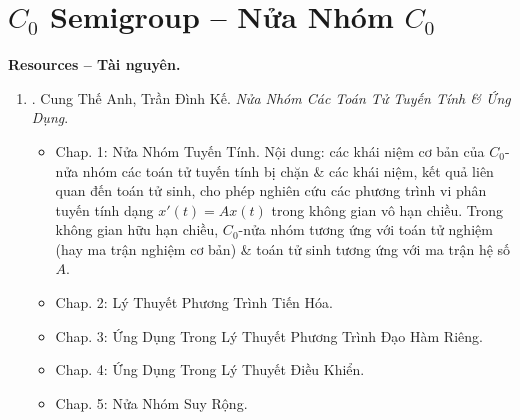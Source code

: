 \documentclass{article}
\begin{document}

\section{$C_0$ Semigroup -- Nửa Nhóm $C_0$}
\textbf{\textsf{Resources -- Tài nguyên.}}
\begin{enumerate}
	\item \cite{Anh_Ke_semigroup}. {\sc Cung Thế Anh, Trần Đình Kế}. {\it Nửa Nhóm Các Toán Tử Tuyến Tính \& Ứng Dụng}.
	
	\begin{itemize}
		\item {\sf Chap. 1: Nửa Nhóm Tuyến Tính.} Nội dung: các khái niệm cơ bản của $C_0$-nửa nhóm các toán tử tuyến tính bị chặn \& các khái niệm, kết quả liên quan đến toán tử sinh, cho phép nghiên cứu các phương trình vi phân tuyến tính dạng $x'(t) = Ax(t)$ trong không gian vô hạn chiều. Trong không gian hữu hạn chiều, $C_0$-nửa nhóm tương ứng với toán tử nghiệm (hay ma trận nghiệm cơ bản) \& toán tử sinh tương ứng với ma trận hệ số $A$.		
		
		\item {\sf Chap. 2: Lý Thuyết Phương Trình Tiến Hóa.}
		\item {\sf Chap. 3: Ứng Dụng Trong Lý Thuyết Phương Trình Đạo Hàm Riêng.}
		\item {\sf Chap. 4: Ứng Dụng Trong Lý Thuyết Điều Khiển.}
		\item {\sf Chap. 5: Nửa Nhóm Suy Rộng.}
	\end{itemize}
\end{enumerate}

\end{document}
